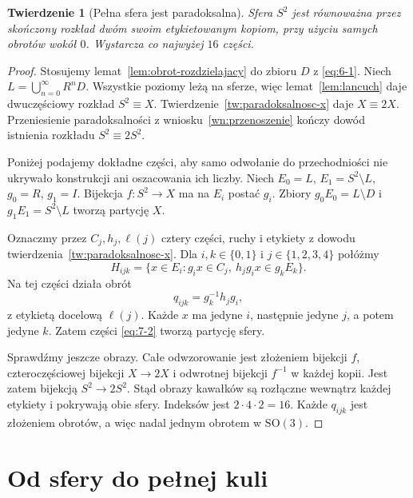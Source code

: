 \documentclass[11pt,a4paper]{article}
\numberwithin{equation}{section}
\theoremstyle{plain}
\newtheorem{twierdzenie}{Twierdzenie}[section]
\theoremstyle{definition}
\theoremstyle{remark}
\begin{document}
\begin{twierdzenie}[Pełna sfera jest paradoksalna]\label{tw:pelna-sfera}
Sfera $S^2$ jest równoważna przez skończony rozkład dwóm swoim etykietowanym kopiom, przy użyciu samych obrotów wokół $0$. Wystarcza co najwyżej $16$ części.
\end{twierdzenie}
\begin{proof}
Stosujemy lemat~\ref{lem:obrot-rozdzielajacy} do zbioru $D$ z \eqref{eq:6-1}. Niech $L=\bigcup_{n=0}^\infty R^nD$. Wszystkie poziomy leżą na sferze, więc lemat~\ref{lem:lancuch} daje dwuczęściowy rozkład $S^2\equiv X$. Twierdzenie~\ref{tw:paradoksalnosc-x} daje $X\equiv2X$. Przeniesienie paradoksalności z wniosku~\ref{wn:przenoszenie} kończy dowód istnienia rozkładu $S^2\equiv2S^2$.

Poniżej podajemy dokładne części, aby samo odwołanie do przechodniości nie ukrywało konstrukcji ani oszacowania ich liczby. Niech $E_0=L$, $E_1=S^2\setminus L$, $g_0=R$, $g_1=I$. Bijekcja $f:S^2\to X$ ma na $E_i$ postać $g_i$. Zbiory $g_0E_0=L\setminus D$ i $g_1E_1=S^2\setminus L$ tworzą partycję $X$.

Oznaczmy przez $C_j,h_j,\ell(j)$ cztery części, ruchy i etykiety z dowodu twierdzenia~\ref{tw:paradoksalnosc-x}. Dla $i,k\in\{0,1\}$ i $j\in\{1,2,3,4\}$ połóżmy
\begin{equation}\label{eq:7-2}
 H_{ijk}=\{x\in E_i:g_ix\in C_j,\ h_jg_ix\in g_kE_k\}.
\end{equation}
Na tej części działa obrót
\begin{equation}\label{eq:7-3}
 q_{ijk}=g_k^{-1}h_jg_i,
\end{equation}
z etykietą docelową $\ell(j)$. Każde $x$ ma jedyne $i$, następnie jedyne $j$, a potem jedyne $k$. Zatem części \eqref{eq:7-2} tworzą partycję sfery.

Sprawdźmy jeszcze obrazy. Całe odwzorowanie jest złożeniem bijekcji $f$, czteroczęściowej bijekcji $X\to2X$ i odwrotnej bijekcji $f^{-1}$ w każdej kopii. Jest zatem bijekcją $S^2\to2S^2$. Stąd obrazy kawałków są rozłączne wewnątrz każdej etykiety i pokrywają obie sfery. Indeksów jest $2\cdot4\cdot2=16$. Każde $q_{ijk}$ jest złożeniem obrotów, a więc nadal jednym obrotem w $\mathrm{SO}(3)$.
\end{proof}

\section{Od sfery do pełnej kuli}
\end{document}
